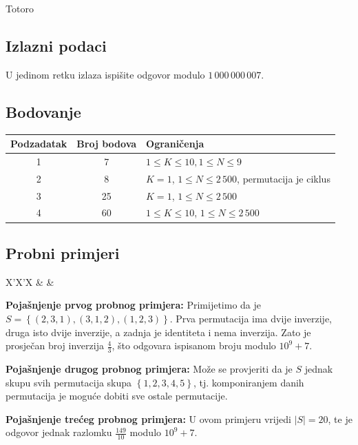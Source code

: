 \begin{statement}[
  problempoints=100,
  timelimit=1 sekunda,
  memorylimit=512 MiB,
]{Totoro}
\subsection*{Izlazni podaci}
U jedinom retku izlaza ispišite odgovor modulo $1\,000\,000\,007$. 

\subsection*{Bodovanje}
{\renewcommand{\arraystretch}{1.4}
  \setlength{\tabcolsep}{6pt}
  \begin{tabular}{ccl}
 Podzadatak & Broj bodova & Ograničenja \\ \midrule
  1 & 7 & $ 1 \le K \le 10, 1 \le N \le 9$ \\
  2 & 8 & $ K = 1 $, $1 \le N \le 2\,500$, permutacija je ciklus \\
  3 & 25 & $ K = 1$, $1 \le N \le 2\,500$ \\
  4 & 60 & $1 \le K \le 10$, $1 \le N \le 2\,500$ \\
\end{tabular}}
\clearpage
\subsection*{Probni primjeri}
\begin{tabularx}{\textwidth}{X'X'X}
 &
 &
\end{tabularx}

\textbf{Pojašnjenje prvog probnog primjera:}
Primijetimo da je $S = \left\{ (2, 3, 1), (3, 1, 2), (1, 2, 3)\right\}$.
Prva permutacija ima dvije inverzije, druga isto dvije inverzije, a zadnja
je identiteta i nema inverzija. Zato je prosječan broj inverzija $\frac{4}{3}$,
što odgovara ispisanom broju modulo $10^9 + 7$.

\textbf{Pojašnjenje drugog probnog primjera:}
Može se provjeriti da je $S$ jednak skupu svih permutacija skupa 
$\left\{1, 2, 3, 4, 5 \right\}$, tj. komponiranjem danih permutacija
je moguće dobiti sve ostale permutacije.

\textbf{Pojašnjenje trećeg probnog primjera:}
U ovom primjeru vrijedi $|S| = 20$, te je odgovor jednak 
razlomku $\frac{149}{10}$ modulo $10^9 + 7$.

\end{statement}

